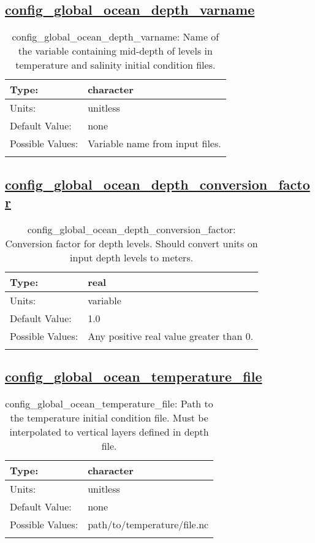\subsection[config\_global\_ocean\_depth\_varname]{\hyperref[sec:nm_tab_global_ocean]{config\_global\_ocean\_depth\_varname}}
\label{subsec:nm_sec_config_global_ocean_depth_varname}
\begin{center}
\begin{longtable}{| p{2.0in} || p{4.0in} |}
    \hline
    Type: & character \\
    \hline
    Units: & \si{unitless} \\
    \hline
    Default Value: & none \\
    \hline
    Possible Values: & Variable name from input files. \\
    \hline
    \caption{config\_global\_ocean\_depth\_varname: Name of the variable containing mid-depth of levels in temperature and salinity initial condition files.}
\end{longtable}
\end{center}
\subsection[config\_global\_ocean\_depth\_conversion\_factor]{\hyperref[sec:nm_tab_global_ocean]{config\_global\_ocean\_depth\_conversion\_factor}}
\label{subsec:nm_sec_config_global_ocean_depth_conversion_factor}
\begin{center}
\begin{longtable}{| p{2.0in} || p{4.0in} |}
    \hline
    Type: & real \\
    \hline
    Units: & \si{variable} \\
    \hline
    Default Value: & 1.0 \\
    \hline
    Possible Values: & Any positive real value greater than 0. \\
    \hline
    \caption{config\_global\_ocean\_depth\_conversion\_factor: Conversion factor for depth levels. Should convert units on input depth levels to meters.}
\end{longtable}
\end{center}
\subsection[config\_global\_ocean\_temperature\_file]{\hyperref[sec:nm_tab_global_ocean]{config\_global\_ocean\_temperature\_file}}
\label{subsec:nm_sec_config_global_ocean_temperature_file}
\begin{center}
\begin{longtable}{| p{2.0in} || p{4.0in} |}
    \hline
    Type: & character \\
    \hline
    Units: & \si{unitless} \\
    \hline
    Default Value: & none \\
    \hline
    Possible Values: & path/to/temperature/file.nc \\
    \hline
    \caption{config\_global\_ocean\_temperature\_file: Path to the temperature initial condition file. Must be interpolated to vertical layers defined in depth file.}
\end{longtable}
\end{center}
